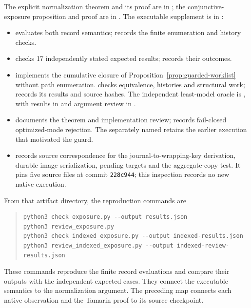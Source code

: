 The explicit normalization theorem and its proof are in
; the conjunctive-exposure proposition and proof
are in . The executable supplement is in
:
\begin{itemize}
\item {} evaluates both record semantics;
 records the finite enumeration and history checks.
\item {} checks 17 independently stated expected
results;  records their outcomes.
\item {} implements the cumulative closure of
Proposition~\ref{prop:guarded-worklist} without path enumeration.
 checks equivalence, histories and structural
work;  records its results and source hashes.
The independent least-model oracle is ,
with results in  and argument review in
.
\item {} documents the theorem and implementation review;
 records fail-closed optimized-mode
rejection. The separately named
 retains the earlier execution
that motivated the guard.
\item {} records source correspondence for the
journal-to-wrapping-key derivation, durable image serialization, pending
targets and the aggregate-copy test. It pins five source files
at commit \texttt{228c944}; this inspection records no new native execution.
\end{itemize}
From that artifact directory, the reproduction commands are
\begin{quote}
\small
\begin{verbatim}
python3 check_exposure.py --output results.json
python3 review_exposure.py
python3 check_indexed_exposure.py --output indexed-results.json
python3 review_indexed_exposure.py --output indexed-review-results.json
\end{verbatim}
\end{quote}
These commands reproduce the finite record evaluations and compare their
outputs with the independent expected cases. They connect the executable
semantics to the normalization argument. The preceding map connects
each native observation and the Tamarin proof to its source checkpoint.

